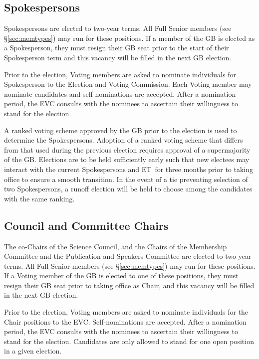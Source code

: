 \documentclass[12pt]{article}
\newcommand{\exec}{{Executive Team}}
\newcommand{\shorte}{{ET}}  %
\begin{document}
\subsection{Spokespersons}

Spokespersons are elected to two-year terms. All Full Senior members (see \S\ref{sec:memtypes}) may run for these positions.  If a member of the GB is elected as a Spokesperson, they must resign their GB seat prior to the start of their Spokesperson term and this vacancy will be filled in the next GB election.

Prior to the election, Voting members are asked to nominate individuals for Spokesperson to the Election and Voting Commission. Each Voting member may nominate candidates and self-nominations are accepted. After a nomination period, the EVC consults with the nominees to ascertain their willingness to stand for the election.

A ranked voting scheme approved by the GB prior to the election is used to determine the Spokespersons.  Adoption of a ranked voting scheme that differs from that used during the previous election requires approval of a supermajority of the GB.  Elections are to be held sufficiently early such that new electees may interact with the current Spokespersons and \shorte\ for three months prior to taking office to ensure a smooth transition. In the event of a tie preventing selection of two Spokespersons, a runoff election will be held to choose among the candidates with the same ranking.

\subsection{Council and Committee Chairs}

The co-Chairs of the Science Council, and the Chairs of the Membership Committee and the Publication and Speakers Committee are elected to two-year terms. All Full Senior members (see \S\ref{sec:memtypes}) may  run for these positions.  If a Voting member of the GB is elected to one of these positions, they must resign their GB seat prior to taking office as Chair, and this vacancy will be filled in the next GB election.

Prior to the election, Voting members are asked to nominate individuals for the Chair positions to the EVC. Self-nominations are accepted. After a nomination period, the EVC consults with the nominees to ascertain their willingness to stand for the election. Candidates are only allowed to stand for one open position in a given election.
\end{document}
